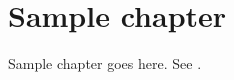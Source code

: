 \chapter{Sample chapter}
\label{chap:sample}

Sample chapter goes here. See \cite{turing2009computing}.
